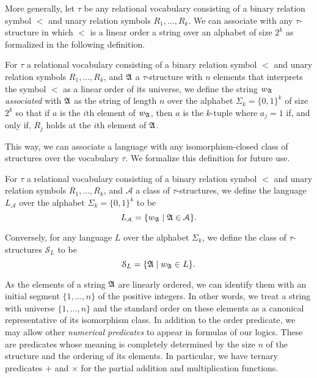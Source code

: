 \documentclass[a4paper,UKenglish,cleveref, autoref, thm-restate, anonymous]{lipics-v2021}
\begin{document}
More generally, let $\tau$ be any relational vocabulary consisting of a binary relation symbol $<$ and unary relation symbols $R_1,\ldots,R_k$.  We can associate with any $\tau$-structure in which $<$ is a linear order a string over an alphabet of size $2^k$ as formalized in the following definition.
\begin{definition}\label{def:associated}
  For $\tau$ a relational vocabulary consisting of a binary relation symbol $<$ and unary relation symbols $R_1,\ldots,R_k$, and $\mathfrak{A}$ a $\tau$-structure with $n$ elements that interprets the symbol $<$ as a linear order of its universe, we define the string $w_{\mathfrak{A}}$ \emph{associated} with $\mathfrak{A}$ as the string of length $n$ over the alphabet $\Sigma_k = \{0,1\}^k$ of size $2^k$ so that if $a$ is the $i$th element  of $w_{\mathfrak{A}}$, then $a$ is the $k$-tuple where $a_j =1$ if, and only if, $R_j$ holds at the $i$th element of $\mathfrak{A}$.
\end{definition}

This way, we can associate a language with any isomorphism-closed class of structures over the vocabulary $\tau$.  We formalize this definition for future use.
\begin{definition}\label{def:associated-lang}
  For $\tau$ a relational vocabulary consisting of a binary relation symbol $<$ and unary relation symbols $R_1,\ldots,R_k$, and $\mathcal{A}$ a class of $\tau$-structures, we define the language $L_{\mathcal{A}}$ over the alphabet $\Sigma_k = \{0,1\}^k$ to be
  $$L_{\mathcal{A}} = \{ w_{\mathfrak{A}} \mid \mathfrak{A} \in \mathcal{A} \}.$$

  Conversely, for any language $L$ over the alphabet $\Sigma_k$, we define the class of $\tau$-structures $\mathcal{S}_L$ to be
  $$\mathcal{S}_L = \{ \mathfrak{A} \mid w_{\mathfrak{A}} \in L \}.$$
\end{definition}

As the elements of a string $\mathfrak{A}$ are linearly ordered, we can identify them with an initial segment $\{1,\ldots,n\}$ of the positive integers.  In other words, we treat a string with universe $\{1,\ldots,n\}$ and the standard order on these elements as a canonical representative of its isomorphism class.  In addition to the order predicate, we may allow other \emph{numerical predicates} to appear in formulas of our logics.  These are predicates whose meaning is completely determined by the size $n$ of the structure and the ordering of its elements.  In particular, we have ternary predicates $+$ and $\times$ for the partial addition and multiplication functions.
\end{document}
